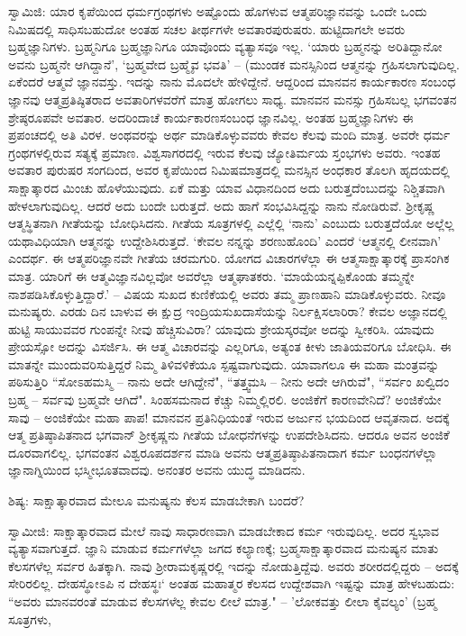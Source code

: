 ಸ್ವಾಮಿಜಿ: ಯಾರ ಕೃಪೆಯಿಂದ ಧರ್ಮಗ್ರಂಥಗಳು ಅಷ್ಟೊಂದು ಹೊಗಳುವ ಆತ್ಮಪರಿಜ್ಞಾನವನ್ನು ಒಂದೇ ಒಂದು ನಿಮಿಷದಲ್ಲಿ ಸಾಧಿಸಬಹುದೋ ಅಂತಹ ಸಚಲ ತೀರ್ಥಗಳೇ ಅವತಾರಪುರುಷರು. ಹುಟ್ಟಿದಾಗಲೇ ಅವರು ಬ್ರಹ್ಮಜ್ಞಾನಿಗಳು. ಬ್ರಹ್ಮನಿಗೂ ಬ್ರಹ್ಮಜ್ಞಾನಿಗೂ ಯಾವೊಂದು ವ್ಯತ್ಯಾಸವೂ ಇಲ್ಲ. ‘ಯಾರು ಬ್ರಹ್ಮನನ್ನು ಅರಿತಿದ್ದಾನೋ ಅವನು ಬ್ರಹ್ಮನೇ ಆಗಿದ್ದಾನೆ’, ‘ಬ್ರಹ್ಮವೇದ ಬ್ರಹ್ಮೈವ ಭವತಿ’ – (ಮುಂಡಕ  ಮನಸ್ಸಿನಿಂದ ಆತ್ಮನನ್ನು ಗ್ರಹಿಸಲಾಗುವುದಿಲ್ಲ. ಏಕೆಂದರೆ ಆತ್ಮವೆ ಜ್ಞಾನವಸ್ತು. ಇದನ್ನು ನಾನು ಮೊದಲೇ ಹೇಳಿದ್ದೇನೆ. ಆದ್ದರಿಂದ ಮಾನವನ ಕಾರ್ಯಕಾರಣ ಸಂಬಂಧ ಜ್ಞಾನವು ಆತ್ಮಪ್ರತಿಷ್ಠಿತರಾದ ಅವತಾರಿಗಳವರೆಗೆ ಮಾತ್ರ ಹೋಗಲು ಸಾಧ್ಯ. ಮಾನವನ ಮನಸ್ಸು ಗ್ರಹಿಸಬಲ್ಲ ಭಗವಂತನ ಶ್ರೇಷ್ಠರೂಪವೇ ಅವತಾರ. ಅದರಿಂದಾಚೆ ಕಾರ್ಯಕಾರಣಸಂಬಂಧ ಜ್ಞಾನವಿಲ್ಲ. ಅಂತಹ ಬ್ರಹ್ಮಜ್ಞಾನಿಗಳು ಈ ಪ್ರಪಂಚದಲ್ಲಿ ಅತಿ ವಿರಳ. ಅಂಥವರನ್ನು ಅರ್ಥ ಮಾಡಿಕೊಳ್ಳುವವರು ಕೇವಲ ಕೆಲವು ಮಂದಿ ಮಾತ್ರ. ಅವರೇ ಧರ್ಮ ಗ್ರಂಥಗಳಲ್ಲಿರುವ ಸತ್ಯಕ್ಕೆ ಪ್ರಮಾಣ. ವಿಶ್ವಸಾಗರದಲ್ಲಿ ಇರುವ ಕೆಲವು ಜ್ಯೋತಿರ್ಮಯ ಸ್ತಂಭಗಳು ಅವರು. ಇಂತಹ ಅವತಾರ ಪುರುಷರ ಸಂಗದಿಂದ, ಅವರ ಕೃಪೆಯಿಂದ ನಿಮಿಷಮಾತ್ರದಲ್ಲಿ ಮನಸ್ಸಿನ ಅಂಧಕಾರ ತೊಲಗಿ ಹೃದಯದಲ್ಲಿ ಸಾಕ್ಷಾತ್ಕಾರದ ಮಿಂಚು ಹೊಳೆಯುವುದು. ಏಕೆ ಮತ್ತು ಯಾವ ವಿಧಾನದಿಂದ ಅದು ಬರುತ್ತದೆಂಬುದನ್ನು ನಿಶ್ಚಿತವಾಗಿ ಹೇಳಲಾಗುವುದಿಲ್ಲ. ಆದರೆ ಅದು ಬಂದೇ ಬರುತ್ತದೆ. ಅದು ಹಾಗೆ ಸಂಭವಿಸಿದ್ದನ್ನು ನಾನು ನೋಡಿರುವೆ. ಶ‍್ರೀಕೃಷ್ಣ ಆತ್ಮಸ್ಥಿತನಾಗಿ ಗೀತೆಯನ್ನು ಬೋಧಿಸಿದನು. ಗೀತೆಯ ಸೂತ್ರಗಳಲ್ಲಿ ಎಲ್ಲೆಲ್ಲಿ ‘ನಾನು’ ಎಂಬುದು ಬರುತ್ತದೆಯೋ ಅಲ್ಲೆಲ್ಲ ಯಥಾವಿಧಿಯಾಗಿ ಆತ್ಮನನ್ನು ಉದ್ದೇಶಿಸಿರುತ್ತದೆ. ‘ಕೇವಲ ನನ್ನನ್ನು ಶರಣುಹೊಂದಿ’ ಎಂದರೆ ‘ಆತ್ಮನಲ್ಲಿ ಲೀನವಾಗಿ’ ಎಂದರ್ಥ. ಈ ಆತ್ಮಪರಿಜ್ಞಾನವೇ ಗೀತೆಯ ಚರಮಗುರಿ. ಯೋಗದ ವಿಚಾರಗಳೆಲ್ಲಾ ಈ ಆತ್ಮಸಾಕ್ಷಾತ್ಕಾರಕ್ಕೆ ಪ್ರಾಸಂಗಿಕ ಮಾತ್ರ. ಯಾರಿಗೆ ಈ ಆತ್ಮವಿಜ್ಞಾನವಿಲ್ಲವೋ ಅವರೆಲ್ಲಾ ಆತ್ಮಘಾತಕರು. ‘ಮಾಯೆಯನ್ನಪ್ಪಿಕೊಂಡು ತಮ್ಮನ್ನೇ ನಾಶಪಡಿಸಿಕೊಳ್ಳುತ್ತಿದ್ದಾರೆ.’ – ವಿಷಯ ಸುಖದ ಕುಣಿಕೆಯಲ್ಲಿ ಅವರು ತಮ್ಮ ಪ್ರಾಣಹಾನಿ ಮಾಡಿಕೊಳ್ಳುವರು. ನೀವೂ ಮನುಷ್ಯರು. ಎರಡು ದಿನ ಬಾಳುವ ಈ ಕ್ಷುದ್ರ ಇಂದ್ರಿಯಸುಖದಾಸೆಯನ್ನು ನಿರ್ಲಕ್ಷಿಸಲಾರಿರಾ? ಕೇವಲ ಅಜ್ಞಾನದಲ್ಲಿ ಹುಟ್ಟಿ ಸಾಯುವವರ ಗುಂಪನ್ನೇ ನೀವು ಹೆಚ್ಚಿಸುವಿರಾ? ಯಾವುದು ಶ್ರೇಯಸ್ಕರವೋ ಅದನ್ನು ಸ್ವೀಕರಿಸಿ. ಯಾವುದು ಪ್ರೇಯಸ್ಸೋ ಅದನ್ನು ವಿಸರ್ಜಿಸಿ. ಈ ಆತ್ಮ ವಿಚಾರವನ್ನು ಎಲ್ಲರಿಗೂ, ಅತ್ಯಂತ ಕೀಳು ಜಾತಿಯವರಿಗೂ ಬೋಧಿಸಿ. ಈ ಮಾತನ್ನೇ ಮುಂದುವರಿಸುತ್ತಿದ್ದರೆ ನಿಮ್ಮ ತಿಳಿವಳಿಕೆಯೂ ಸ್ಪಷ್ಟವಾಗುವುದು. ಯಾವಾಗಲೂ ಈ ಮಹಾ ಮಂತ್ರವನ್ನು ಪಠಿಸುತ್ತಿರಿ “ಸೋಽಹಮಸ್ಮಿ – ನಾನು ಅದೇ ಆಗಿದ್ದೇನೆ", “ತತ್ತ್ವಮಸಿ – ನೀನು ಅದೇ ಆಗಿರುವೆ", “ಸರ್ವಂ ಖಲ್ವಿದಂ ಬ್ರಹ್ಮ – ಸರ್ವವು ಬ್ರಹ್ಮವೇ ಆಗಿದೆ". ಸಿಂಹಸಮನಾದ ಕೆಚ್ಚು ನಿಮ್ಮಲ್ಲಿರಲಿ. ಅಂಜಿಕೆಗೆ ಕಾರಣವೇನಿದೆ? ಅಂಜಿಕೆಯೇ ಸಾವು – ಅಂಜಿಕೆಯೇ ಮಹಾ ಪಾಪ! ಮಾನವನ ಪ್ರತಿನಿಧಿಯಂತೆ ಇರುವ ಅರ್ಜುನ ಭಯದಿಂದ ಆವೃತನಾದ. ಅದಕ್ಕೆ ಆತ್ಮ ಪ್ರತಿಷ್ಠಾಪಿತನಾದ ಭಗವಾನ್ ಶ‍್ರೀಕೃಷ್ಣನು ಗೀತೆಯ ಬೋಧನೆಗಳನ್ನು ಉಪದೇಶಿಸಿದನು. ಆದರೂ ಅವನ ಅಂಜಿಕೆ ದೂರವಾಗಲಿಲ್ಲ. ಭಗವಂತನ ವಿಶ್ವರೂಪದರ್ಶನ ಮಾಡಿ ಅವನು ಆತ್ಮಪ್ರತಿಷ್ಠಾಪಿತನಾದಾಗ ಕರ್ಮ ಬಂಧನಗಳೆಲ್ಲಾ ಜ್ಞಾನಾಗ್ನಿಯಿಂದ ಭಸ್ಮೀಭೂತವಾದವು. ಅನಂತರ ಅವನು ಯುದ್ಧ ಮಾಡಿದನು.

ಶಿಷ್ಯ: ಸಾಕ್ಷಾತ್ಕಾರವಾದ ಮೇಲೂ ಮನುಷ್ಯನು ಕೆಲಸ ಮಾಡಬೇಕಾಗಿ ಬಂದರೆ?

ಸ್ವಾಮೀಜಿ: ಸಾಕ್ಷಾತ್ಕಾರವಾದ ಮೇಲೆ ನಾವು ಸಾಧಾರಣವಾಗಿ ಮಾಡಬೇಕಾದ ಕರ್ಮ ಇರುವುದಿಲ್ಲ. ಅದರ ಸ್ವಭಾವ ವ್ಯತ್ಯಾಸವಾಗುತ್ತದೆ. ಜ್ಞಾನಿ ಮಾಡುವ ಕರ್ಮಗಳೆಲ್ಲಾ ಜಗದ ಕಲ್ಯಾಣಕ್ಕೆ; ಬ್ರಹ್ಮಸಾಕ್ಷಾತ್ಕಾರವಾದ ಮನುಷ್ಯನ ಮಾತು ಕೆಲಸಗಳೆಲ್ಲ ಸರ್ವರ ಹಿತಕ್ಕಾಗಿ. ನಾವು ಶ‍್ರೀರಾಮಕೃಷ್ಣರಲ್ಲಿ ಇದನ್ನು ನೋಡುತ್ತಿದ್ದೆವು. ಅವರು ಶರೀರದಲ್ಲಿದ್ದರು – ಅದಕ್ಕೆ ಸೇರಿರಲಿಲ್ಲ. ದೇಹಸ್ಥೋಽಪಿ ನ ದೇಹಸ್ಥಃ‘ ಅಂತಹ ಮಹಾತ್ಮರ ಕೆಲಸದ ಉದ್ದೇಶವಾಗಿ ಇಷ್ಟನ್ನು ಮಾತ್ರ ಹೇಳಬಹುದು: “ಅವರು ಮಾನವರಂತೆ ಮಾಡುವ ಕೆಲಸಗಳೆಲ್ಲ ಕೇವಲ ಲೀಲೆ ಮಾತ್ರ." – ’ಲೋಕವತ್ತು ಲೀಲಾ ಕೈವಲ್ಯಂ' (ಬ್ರಹ್ಮ ಸೂತ್ರಗಳು, 

